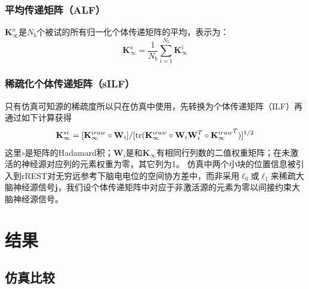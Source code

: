 \subsubsection{平均传递矩阵（ALF）}
$\mathbf{K}_{\infty}^a$是$N_b$个被试的所有归一化个体传递矩阵的平均，表示为：
\begin{equation*}
\mathbf{K}_{\infty}^a=\frac{1}{N_b}\sum_{i=1}^{N_b}\mathbf{K}_{\infty}^i
\end{equation*}

\subsubsection{稀疏化个体传递矩阵（sILF）}
只有仿真可知源的稀疏度所以只在仿真中使用，先转换为个体传递矩阵（ILF）再通过如下计算获得
\begin{equation*}
\mathbf{K}_{\infty}^{si}=[\mathbf{K}_{\infty}^{iraw}\circ\mathbf{W}_i]/{[\operatorname{tr}(\mathbf{K}_{\infty}^{iraw}\circ\mathbf{W}_i\mathbf{W}_i^T\circ{\mathbf{K}_{\infty}^{iraw}}^T)]^{1/2}}
\end{equation*}
这里$\circ$是矩阵的Hadamard积；$\mathbf{W}_i$是和$\mathbf{K}_{\infty}$有相同行列数的二值权重矩阵；在未激活的神经源对应列的元素权重为零，其它列为1。 仿真中两个小块的位置信息被引入到rREST对无穷远参考下脑电电位的空间协方差中，而非采用$\ell_0$或$\ell_1$来稀疏大脑神经源信号$\mathbf{j}$，我们设个体传递矩阵中对应于非激活源的元素为零以间接约束大脑神经源信号。

\section{结果}
\subsection{仿真比较}
